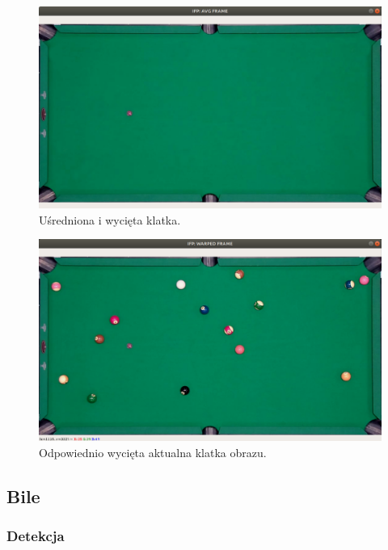 \documentclass[12pt]{article}
\begin{document}
\begin{figure}[h]
    \centering
    \includegraphics[width=15cm]{./images/obrazki/ifp/avg_frame.png}
    \caption{Uśredniona i wycięta klatka.}
    \label{avg_frame}
\end{figure}

\begin{figure}[h]
    \centering
    \includegraphics[width=15cm]{./images/obrazki/ifp/warped_frame.png}
    \caption{Odpowiednio wycięta aktualna klatka obrazu.}
    \label{warped_frame}
\end{figure}

\clearpage

\subsection{Bile}

\subsubsection{Detekcja}
\end{document}
